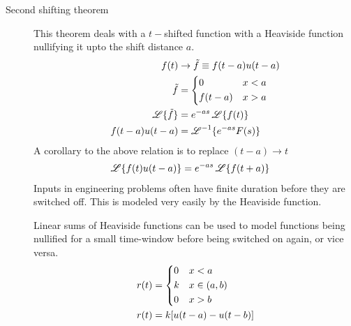 \begin{description}
    \item[Second shifting theorem] This theorem deals with a $ t-$shifted function with
        a Heaviside function nullifying it upto the shift distance $ a $.
        \begin{align}
            f(t)              & \rightarrow \tilde{f} \equiv f(t-a)u(t-a) \\
            \tilde{f}         & = \begin{dcases}
                                      0      & x < a \\
                                      f(t-a) & x > a
                                  \end{dcases}                          \\
            \operatorname{\mathscr{L}}\{\tilde{f}\} & = e^{-as}\operatorname{\mathscr{L}}\{f(t)\}                     \\
            f(t-a)u(t-a)      & = \operatorname{\mathscr{L}}^{-1}\{e^{-as}F(s)\}
        \end{align}
        A corollary to the above relation is to replace $ (t-a) \rightarrow t $
        \begin{align}
            \operatorname{\mathscr{L}}\{f(t)u(t-a)\} & = e^{-as}\operatorname{\mathscr{L}}\{f(t+a)\}
        \end{align}
        Inputs in engineering problems often have finite duration before they are
        switched off. This is modeled very easily by the Heaviside function. \par
        Linear sums of Heaviside functions can be used to model functions being
        nullified for a small time-window before being switched on again, or vice
        versa.
        \begin{align}
            r(t) & = \begin{dcases}
                         0 & x < a       \\
                         k & x \in (a,b) \\
                         0 & x > b
                     \end{dcases}    \\
            r(t) & = k[u(t-a) - u(t-b)]
        \end{align}
\end{description}

